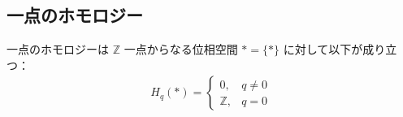 \documentclass[algtopo_main]{subfiles}
\begin{document}


\subsection{一点のホモロジー}

\begin{myprop}[label=prop:property2]{一点のホモロジーは $\mathbb{Z}$}
    一点からなる位相空間 $* = \{*\}$ に対して以下が成り立つ：
    \begin{align}
        H_q(*) = 
        \begin{cases}
            0, & q \neq 0 \\
            \mathbb{Z}, & q=0
        \end{cases}
    \end{align}
\end{myprop}
\end{document}
